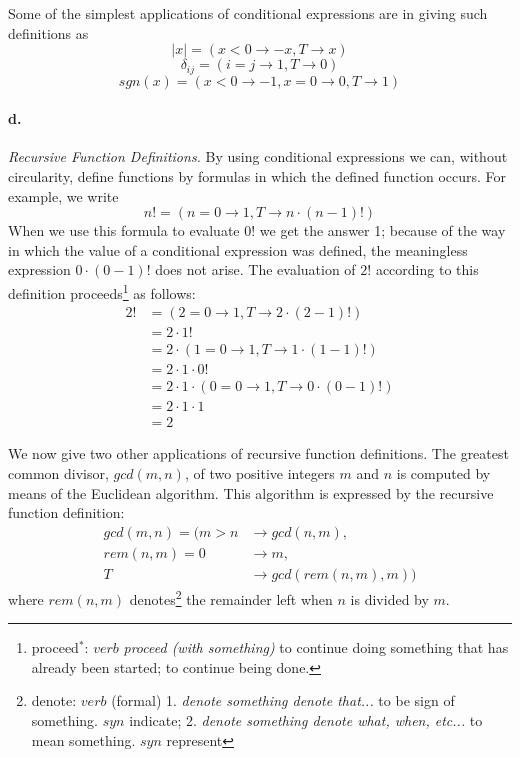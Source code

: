\documentclass[11pt, a4paper]{article}
\begin{document}
Some of the simplest applications of conditional expressions are in giving such
definitions as
$$ |x| = (x < 0 \to -x, T \to x) $$
$$ \delta_{ij} = (i = j \to 1, T \to 0) $$
$$ sgn(x) = (x < 0 \to -1, x = 0 \to 0, T \to 1) $$

\paragraph{d.}\textit{Recursive Function Definitions.}
By using conditional expressions we can, without circularity, define functions
by formulas in which the defined function occurs. For example, we write
$$ n! = (n = 0 \to 1, T \to n \cdot (n - 1)!) $$
When we use this formula to evaluate $0!$ we get the answer 1; because of the
way in which the value of a conditional expression was defined, the meaningless
expression $0 \cdot (0 - 1)!$ does not arise. The evaluation of $2!$ according
to this definition
proceeds\footnote{proceed$^*$: $verb$ \textit{proceed (with something)} to
  continue doing something that has already been started; to continue being
  done.}
as follows:
\begin{align*}
  2! &= (2 = 0 \to 1, T \to 2 \cdot (2 - 1)!) \\
     &= 2 \cdot 1!                                            \\
     &= 2 \cdot (1 = 0 \to 1, T \to 1 \cdot (1 - 1)!) \\
     &= 2 \cdot 1 \cdot 0!                                    \\
     &= 2 \cdot 1 \cdot (0 = 0 \to 1, T \to 0 \cdot (0 - 1)!) \\
     &= 2 \cdot 1 \cdot 1                                     \\
     &= 2
\end{align*}

We now give two other applications of recursive function definitions. The
greatest common divisor, $gcd(m, n)$, of two positive integers $m$ and $n$ is
computed by means of the Euclidean algorithm. This algorithm is expressed by the
recursive function definition:
\begin{align*}
  gcd(m, n) = (m > n &\to gcd(n, m), \\
       rem(n, m) = 0 &\to m,         \\
                   T &\to gcd(rem(n, m), m))
\end{align*}
where $rem(n, m)$
denotes\footnote{denote: $verb$ (formal) 1. \textit{denote something
    \text{\textbar} denote that...} to be sign of something. $syn$ indicate;
  2. \textit{denote something \text{\textbar} denote what, when, etc...} to mean
  something. $syn$ represent}
the remainder left when $n$ is divided by $m$.
\end{document}
